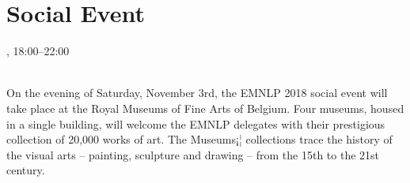 \section{Social Event}
\setheaders{}{\daydateyear}

\begin{center}



\daydateyear, 18:00--22:00\vspace{1em}\\
\SocialEventLoc\\
\end{center}
On the evening of Saturday, November 3rd, the EMNLP 2018 social event will take place at the Royal Museums of Fine Arts of Belgium. Four museums, housed in a single building, will welcome the EMNLP delegates with their prestigious collection of 20,000 works of art. The Museums¡¦ collections trace the history of the visual arts -- painting, sculpture and drawing -- from the 15th to the 21st century.
